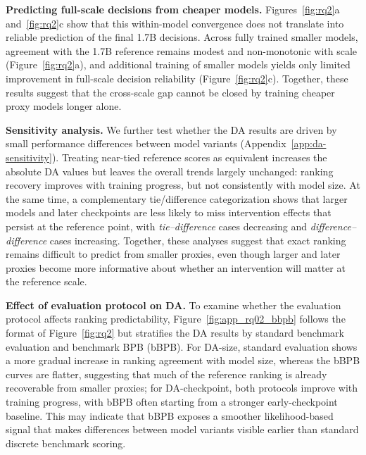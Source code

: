 \textbf{Predicting full-scale decisions from cheaper models.}
Figures~\ref{fig:rq2}a and~\ref{fig:rq2}c show that this within-model convergence does not translate into reliable prediction of the final 1.7B decisions.
Across fully trained smaller models, agreement with the 1.7B reference remains modest and non-monotonic with scale (Figure~\ref{fig:rq2}a), and additional training of smaller models yields only limited improvement in full-scale decision reliability (Figure~\ref{fig:rq2}c).
Together, these results suggest that the cross-scale gap cannot be closed by training cheaper proxy models longer alone.


\textbf{Sensitivity analysis.}
We further test whether the DA results are driven by small performance differences between model variants (Appendix~\ref{app:da-sensitivity}). Treating near-tied reference scores as equivalent increases the absolute DA values but leaves the overall trends largely unchanged: ranking recovery improves with training progress, but not consistently with model size. At the same time, a complementary tie/difference categorization shows that larger models and later checkpoints are less likely to miss intervention effects that persist at the reference point, with \emph{tie--difference} cases decreasing and \emph{difference--difference} cases increasing. Together, these analyses suggest that exact ranking remains difficult to predict from smaller proxies, even though larger and later proxies become more informative about whether an intervention will matter at the reference scale.


\textbf{Effect of evaluation protocol on DA.}
To examine whether the evaluation protocol affects ranking predictability, Figure~\ref{fig:app_rq02_bbpb} follows the format of Figure~\ref{fig:rq2} but stratifies the DA results by standard benchmark evaluation and benchmark BPB (bBPB). For DA-size, standard evaluation shows a more gradual increase in ranking agreement with model size, whereas the bBPB curves are flatter, suggesting that much of the reference ranking is already recoverable from smaller proxies; for DA-checkpoint, both protocols improve with training progress, with bBPB often starting from a stronger early-checkpoint baseline. This may indicate that bBPB exposes a smoother likelihood-based signal that makes differences between model variants visible earlier than standard discrete benchmark scoring.

